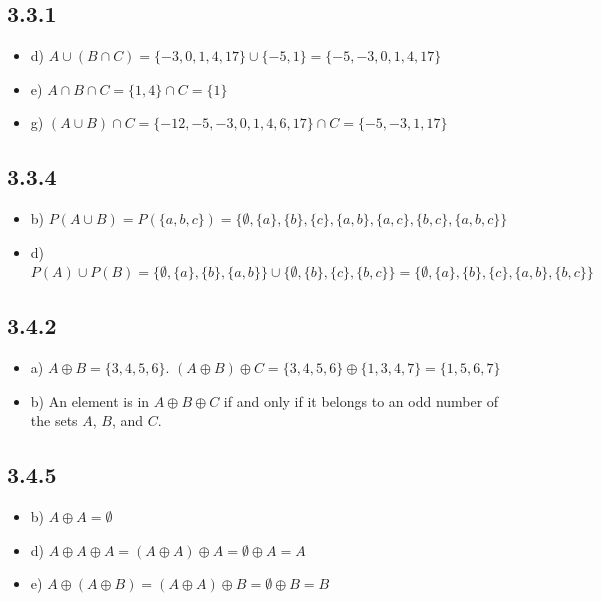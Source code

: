 \documentclass{article}
\begin{document}
\subsection*{3.3.1}
\begin{itemize}
    \item d) $A \cup (B \cap C) = \{-3, 0, 1, 4, 17\} \cup \{-5, 1\} = \{-5, -3, 0, 1, 4, 17\}$
    \item e) $A \cap B \cap C = \{1, 4\} \cap C = \{1\}$
    \item g) $(A \cup B) \cap C = \{-12, -5, -3, 0, 1, 4, 6, 17\} \cap C = \{-5, -3, 1, 17\}$
\end{itemize}

\subsection*{3.3.4}
\begin{itemize}
    \item b) $P(A \cup B) = P(\{a, b, c\}) = \{\emptyset, \{a\}, \{b\}, \{c\}, \{a,b\}, \{a,c\}, \{b,c\}, \{a,b,c\}\}$
    \item d) $P(A) \cup P(B) = \{\emptyset, \{a\}, \{b\}, \{a,b\}\} \cup \{\emptyset, \{b\}, \{c\}, \{b,c\}\} = \{\emptyset, \{a\}, \{b\}, \{c\}, \{a,b\}, \{b,c\}\}$
\end{itemize}

\subsection*{3.4.2}
\begin{itemize}
    \item a) $A \oplus B = \{3, 4, 5, 6\}$. $(A \oplus B) \oplus C = \{3, 4, 5, 6\} \oplus \{1, 3, 4, 7\} = \{1, 5, 6, 7\}$
    \item b) An element is in $A \oplus B \oplus C$ if and only if it belongs to an odd number of the sets $A$, $B$, and $C$.
\end{itemize}

\subsection*{3.4.5}
\begin{itemize}
    \item b) $A \oplus A = \emptyset$
    \item d) $A \oplus A \oplus A = (A \oplus A) \oplus A = \emptyset \oplus A = A$
    \item e) $A \oplus (A \oplus B) = (A \oplus A) \oplus B = \emptyset \oplus B = B$
\end{itemize}
\end{document}
